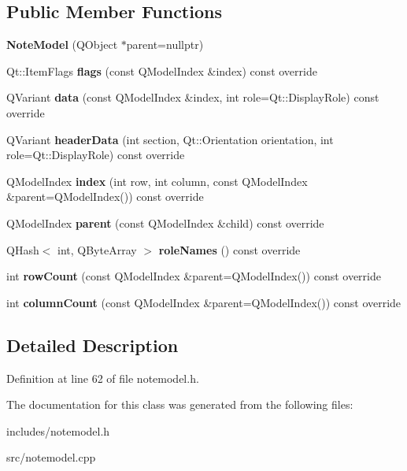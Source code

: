 \subsection*{Public Member Functions}
\begin{DoxyCompactItemize}
\item 
\mbox{\label{classNoteModel_a8cdb8b7c9a4a7230b6703593b9881a38}} 
{\bfseries Note\+Model} (Q\+Object $\ast$parent=nullptr)
\item 
\mbox{\label{classNoteModel_a5c2b327f4aceca68ce84627dd14d3eed}} 
Qt\+::\+Item\+Flags {\bfseries flags} (const Q\+Model\+Index \&index) const override
\item 
\mbox{\label{classNoteModel_af7b59b219ab71617116f6dd74f315766}} 
Q\+Variant {\bfseries data} (const Q\+Model\+Index \&index, int role=Qt\+::\+Display\+Role) const override
\item 
\mbox{\label{classNoteModel_a94ede21a096dba8a182efe70a6235ff8}} 
Q\+Variant {\bfseries header\+Data} (int section, Qt\+::\+Orientation orientation, int role=Qt\+::\+Display\+Role) const override
\item 
\mbox{\label{classNoteModel_a0c569f32aa87c740fb2d646c54e5334d}} 
Q\+Model\+Index {\bfseries index} (int row, int column, const Q\+Model\+Index \&parent=Q\+Model\+Index()) const override
\item 
\mbox{\label{classNoteModel_a2ee27f84cd8fe9b0e7f0222bace1fb7f}} 
Q\+Model\+Index {\bfseries parent} (const Q\+Model\+Index \&child) const override
\item 
\mbox{\label{classNoteModel_af46fc83db7101b3e332382b0804ef51b}} 
Q\+Hash$<$ int, Q\+Byte\+Array $>$ {\bfseries role\+Names} () const override
\item 
\mbox{\label{classNoteModel_a1abbcfea2189d4496ddb25332a73ab38}} 
int {\bfseries row\+Count} (const Q\+Model\+Index \&parent=Q\+Model\+Index()) const override
\item 
\mbox{\label{classNoteModel_ada056af2d7b7ff4ab515e9f01867aae6}} 
int {\bfseries column\+Count} (const Q\+Model\+Index \&parent=Q\+Model\+Index()) const override
\end{DoxyCompactItemize}


\subsection{Detailed Description}


Definition at line 62 of file notemodel.\+h.



The documentation for this class was generated from the following files\+:\begin{DoxyCompactItemize}
\item 
includes/notemodel.\+h\item 
src/notemodel.\+cpp\end{DoxyCompactItemize}
